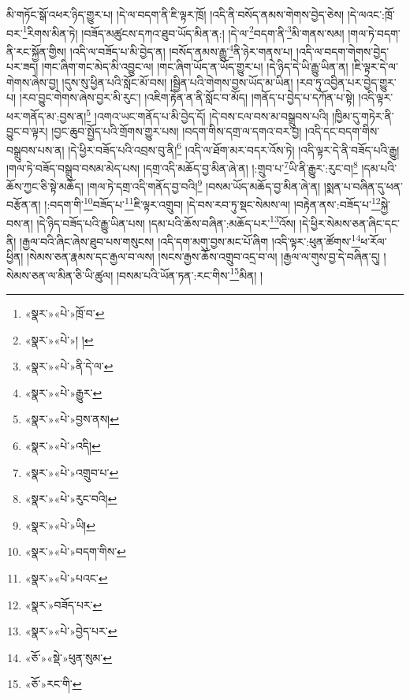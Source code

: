 མི་གཏོང་སྒོ་འཕར་ཉིད་གྱུར་པ། །དེ་ལ་བདག་ནི་ཇི་ལྟར་ཁྲོ། །འདི་ནི་བསོད་ནམས་གེགས་བྱེད་ཅེས། །དེ་ལའང་:ཁྲོ་བར་\footnote{«སྣར་»«པེ་»ཁྲོ་བ་}རིགས་མིན་ཏེ། །བཟོད་མཚུངས་དཀའ་ཐུབ་ཡོད་མིན་ན:། །དེ་ལ་\footnote{«སྣར་»«པེ་»། །}བདག་ནི་\footnote{«སྣར་»«པེ་»ནི་དེ་ལ་}མི་གནས་སམ། །གལ་ཏེ་བདག་ནི་རང་སྐྱོན་གྱིས། །འདི་ལ་བཟོད་པ་མི་བྱེད་ན། །བསོད་ནམས་རྒྱུ་\footnote{«སྣར་»«པེ་»རྒྱུར་}ནི་ཉེར་གནས་པ། །འདི་ལ་བདག་གེགས་བྱེད་པར་ཟད། །གང་ཞིག་གང་མེད་མི་འབྱུང་ལ། །གང་ཞིག་ཡོད་ན་ཡོད་གྱུར་པ། །དེ་ཉིད་དེ་ཡི་རྒྱུ་ཡིན་ན། །ཇི་ལྟར་དེ་ལ་གེགས་ཞེས་བྱ། །དུས་སུ་ཕྱིན་པའི་སློང་མོ་བས། །སྦྱིན་པའི་གེགས་བྱས་ཡོད་མ་ཡིན། །རབ་ཏུ་འབྱིན་པར་བྱེད་གྱུར་པ། །རབ་བྱུང་གེགས་ཞེས་བྱར་མི་རུང་། །འཇིག་རྟེན་ན་ནི་སློང་བ་མོད། །གནོད་པ་བྱེད་པ་དཀོན་པ་སྟེ། །འདི་ལྟར་ཕར་གནོད་མ་:བྱས་ན།\footnote{«སྣར་»«པེ་»བྱས་ནས།} །འགའ་ཡང་གནོད་པ་མི་བྱེད་དོ། །དེ་བས་ངལ་བས་མ་བསྒྲུབས་པའི། །ཁྱིམ་དུ་གཏེར་ནི་བྱུང་བ་ལྟར། །བྱང་ཆུབ་སྤྱོད་པའི་གྲོགས་གྱུར་པས། །བདག་གིས་དགྲ་ལ་དགའ་བར་བྱ། །འདི་དང་བདག་གིས་བསྒྲུབས་པས་ན། །དེ་ཕྱིར་བཟོད་པའི་འབྲས་བུ་ནི།\footnote{«སྣར་»«པེ་»འདི།} །འདི་ལ་ཐོག་མར་བདར་འོས་ཏེ། །འདི་ལྟར་དེ་ནི་བཟོད་པའི་རྒྱུ། །གལ་ཏེ་བཟོད་བསྒྲུབ་བསམ་མེད་པས། །དགྲ་འདི་མཆོད་བྱ་མིན་ཞེ་ན། །:གྲུབ་པ་\footnote{«སྣར་»«པེ་»འགྲུབ་པ་}ཡི་ནི་རྒྱུར་:རུང་བ།\footnote{«སྣར་»«པེ་»རུང་བའི།} །དམ་པའི་ཆོས་ཀྱང་ཅི་སྟེ་མཆོད། །གལ་ཏེ་དགྲ་འདི་གནོད་བྱ་བའི།\footnote{«སྣར་»«པེ་»ཡི།} །བསམ་ཡོད་མཆོད་བྱ་མིན་ཞེ་ན། །སྨན་པ་བཞིན་དུ་ཕན་བརྩོན་ན། །:བདག་གི་\footnote{«སྣར་»«པེ་»བདག་གིས་}བཟོད་པ་\footnote{«སྣར་»«པེ་»པའང་}ཇི་ལྟར་འགྲུབ། །དེ་བས་རབ་ཏུ་སྡང་སེམས་ལ། །བརྟེན་ནས་:བཟོད་པ་\footnote{«སྣར་»བཟོད་པར་}སྐྱེ་བས་ན། །དེ་ཉིད་བཟོད་པའི་རྒྱུ་ཡིན་པས། །དམ་པའི་ཆོས་བཞིན་:མཆོད་པར་\footnote{«སྣར་»«པེ་»བྱེད་པར་}འོས། །དེ་ཕྱིར་སེམས་ཅན་ཞིང་དང་ནི། །རྒྱལ་བའི་ཞིང་ཞེས་ཐུབ་པས་གསུངས། །འདི་དག་མགུ་བྱས་མང་པོ་ཞིག །འདི་ལྟར་:ཕུན་ཚོགས་\footnote{«ཅོ་»«སྡེ་»ཕུན་སུམ་}ཕ་རོལ་ཕྱིན། །སེམས་ཅན་རྣམས་དང་རྒྱལ་བ་ལས། །སངས་རྒྱས་ཆོས་འགྲུབ་འདྲ་བ་ལ། །རྒྱལ་ལ་གུས་བྱ་དེ་བཞིན་དུ། །སེམས་ཅན་ལ་མིན་ཅི་ཡི་ཚུལ། །བསམ་པའི་ཡོན་ཏན་:རང་གིས་\footnote{«ཅོ་»རང་གི་}མིན། །
